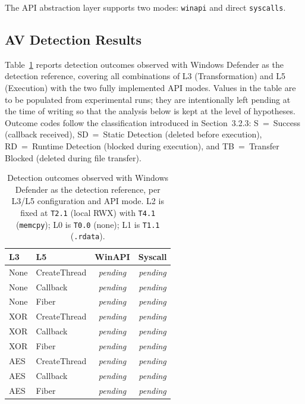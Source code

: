 The API abstraction layer supports two modes: \texttt{winapi} and direct \texttt{syscalls}.

\subsection{AV Detection Results}

Table~\ref{tab:results} reports detection outcomes observed with Windows Defender as the detection reference, covering all combinations of L3 (Transformation) and L5 (Execution) with the two fully implemented API modes.
Values in the table are to be populated from experimental runs; they are intentionally left pending at the time of writing so that the analysis below is kept at the level of hypotheses.
Outcome codes follow the classification introduced in Section~3.2.3: S~=~Success (callback received), SD~=~Static Detection (deleted before execution), RD~=~Runtime Detection (blocked during execution), and TB~=~Transfer Blocked (deleted during file transfer).

\begin{table}[htbp]
    \centering
    \caption{Detection outcomes observed with Windows Defender as the detection reference, per L3/L5 configuration and API mode. L2 is fixed at \texttt{T2.1} (local RWX) with \texttt{T4.1} (\texttt{memcpy}); L0 is \texttt{T0.0} (none); L1 is \texttt{T1.1} (\texttt{.rdata}).}
    \label{tab:results}
    \small
    \begin{tabular}{@{}llcc@{}}
        \toprule
        \textbf{L3} & \textbf{L5} & \textbf{WinAPI} & \textbf{Syscall} \\
        \midrule
        None & CreateThread   & \textit{pending} & \textit{pending} \\
        None & Callback       & \textit{pending} & \textit{pending} \\
        None & Fiber          & \textit{pending} & \textit{pending} \\
        XOR  & CreateThread   & \textit{pending} & \textit{pending} \\
        XOR  & Callback       & \textit{pending} & \textit{pending} \\
        XOR  & Fiber          & \textit{pending} & \textit{pending} \\
        AES  & CreateThread   & \textit{pending} & \textit{pending} \\
        AES  & Callback       & \textit{pending} & \textit{pending} \\
        AES  & Fiber          & \textit{pending} & \textit{pending} \\
        \bottomrule
    \end{tabular}
\end{table}

